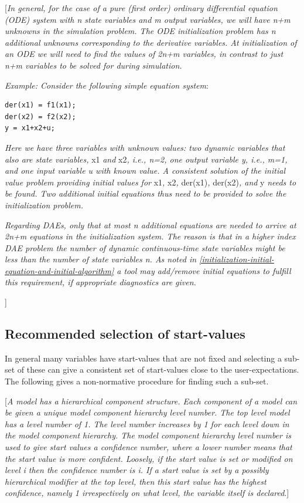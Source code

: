 \documentclass[10pt,a4paper]{report}
\def\doublelabel#1{\label{#1}\hypertarget{#1}{}}
\begin{document}
{[}\emph{In general, for the case of a pure (first order) ordinary
differential equation (ODE) system with n state variables and m output
variables, we will have n+m unknowns in the simulation problem. The ODE
initialization problem has n additional unknowns corresponding to the
derivative variables. At initialization of an ODE we will need to find
the values of 2n+m variables, in contrast to just n+m variables to be
solved for during simulation.}

\emph{Example: Consider the following simple equation system}:
\begin{lstlisting}[language=modelica]
der(x1) = f1(x1);
der(x2) = f2(x2);
y = x1+x2+u;
\end{lstlisting}

\emph{Here we have three variables with unknown values: two dynamic
variables that also are state variables,} x1 \emph{and} x2\emph{, i.e.,
n=2, one output variable y, i.e., m=1, and one input variable u with
known value. A consistent solution of the initial value problem
providing initial values for} x1\emph{,} x2\emph{,} der(x1)\emph{,}
der(x2)\emph{, and} y \emph{needs to be found. Two additional initial
equations thus need to be provided to solve the initialization problem.}

\emph{Regarding DAEs, only that at most n additional equations are
needed to arrive at 2n+m equations in the initialization system. The
reason is that in a higher index DAE problem the number of dynamic
continuous-time state variables might be less than the number of state
variables n. As noted in \ref{initialization-initial-equation-and-initial-algorithm} a tool may add/remove
initial equations to fulfill this requirement, if appropriate
diagnostics are given. }

{]}

\subsection{Recommended selection of start-values}\doublelabel{recommended-selection-of-start-values}

In general many variables have start-values that are not fixed and
selecting a sub-set of these can give a consistent set of start-values
close to the user-expectations. The following gives a non-normative
procedure for finding such a sub-set.

{[}\emph{A model has a hierarchical component structure. Each component
of a model can be given a unique model component hierarchy level number.
The top level model has a level number of 1. The level number increases
by 1 for each level down in the model component hierarchy. The model
component hierarchy level number is used to give start values a
confidence number, where a lower number means that the start value is
more confident. Loosely, if the start value is set or modified on level
i then the confidence number is i. If a start value is set by a possibly
hierarchical modifier at the top level, then this start value has the
highest confidence, namely 1 irrespectively on what level, the variable
itself is declared}.{]}
\end{document}
